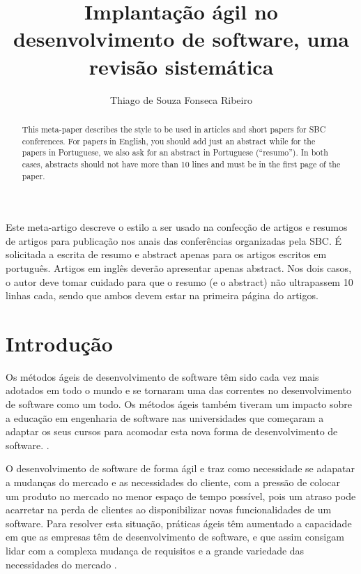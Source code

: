 \documentclass[12pt]{article}
\title{Implantação ágil no desenvolvimento de software, uma revisão sistemática}
\author{Thiago  de Souza Fonseca Ribeiro\inst{1}}
\begin{document}
\maketitle

\begin{abstract}
  This meta-paper describes the style to be used in articles and short papers
  for SBC conferences. For papers in English, you should add just an abstract
  while for the papers in Portuguese, we also ask for an abstract in
  Portuguese (``resumo''). In both cases, abstracts should not have more than
  10 lines and must be in the first page of the paper.
\end{abstract}

\begin{resumo}
  Este meta-artigo descreve o estilo a ser usado na confecção de artigos e
  resumos de artigos para publicação nos anais das conferências organizadas
  pela SBC. É solicitada a escrita de resumo e abstract apenas para os artigos
  escritos em português. Artigos em inglês deverão apresentar apenas abstract.
  Nos dois casos, o autor deve tomar cuidado para que o resumo (e o abstract)
  não ultrapassem 10 linhas cada, sendo que ambos devem estar na primeira
  página do artigos.
\end{resumo}

\section{Introdução}\label{sec1}

Os métodos ágeis de desenvolvimento de software têm sido
cada vez mais adotados em todo o mundo e se tornaram uma das correntes no desenvolvimento de software como um todo. Os métodos ágeis também tiveram um impacto sobre a educação em engenharia de software nas universidades que começaram a adaptar os seus cursos para acomodar esta nova forma de desenvolvimento de software. \cite{brazil}.

O desenvolvimento de software de forma ágil e traz como necessidade se adapatar a mudanças do mercado e as necessidades do cliente, com a pressão de colocar um produto no mercado no menor espaço de tempo possível, pois um atraso pode acarretar na perda de clientes ao disponibilizar novas funcionalidades de um software. Para resolver esta situação, práticas ágeis têm aumentado a capacidade em que as empresas têm de desenvolvimento de software, e que assim consigam lidar com a complexa mudança de requisitos e a grande variedade das necessidades do mercado \cite{dzamashvili2010impact}.
\end{document}
